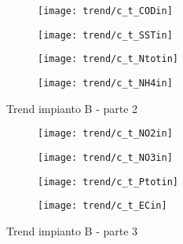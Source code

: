 \begin{sidewaysfigure}[h]\ContinuedFloat
	\renewcommand*\thesubfigure{(\arabic{subfigure})}
	\begin{subfigure}{0.49\textwidth}
		\texttt{[image: trend/c\_t\_CODin]}
		\caption{}
		\label{fig:c_t_CODin}
		\centering
	\end{subfigure}
	\begin{subfigure}{0.49\textwidth}
		\texttt{[image: trend/c\_t\_SSTin]}
		\caption{}
		\centering
	\end{subfigure}

	\begin{subfigure}{0.49\textwidth}
		\texttt{[image: trend/c\_t\_Ntotin]}
		\caption{}
		\centering
	\end{subfigure}
	\begin{subfigure}{0.49\textwidth}
		\texttt{[image: trend/c\_t\_NH4in]}	
		\caption{}
		\centering
	\end{subfigure}
	\caption{Trend impianto B - parte 2}
\end{sidewaysfigure}

\begin{sidewaysfigure}[h]\ContinuedFloat
	\renewcommand*\thesubfigure{(\arabic{subfigure})}
	\begin{subfigure}{0.49\textwidth}
		\texttt{[image: trend/c\_t\_NO2in]}
		\caption{}
		\label{fig:c_t_NO2in}
		\centering
	\end{subfigure}
	\begin{subfigure}{0.49\textwidth}
		\texttt{[image: trend/c\_t\_NO3in]}
		\caption{}
		\centering
	\end{subfigure}

	\begin{subfigure}{0.49\textwidth}
		\texttt{[image: trend/c\_t\_Ptotin]}
		\caption{}
		\centering
	\end{subfigure}
	\begin{subfigure}{0.49\textwidth}
		\texttt{[image: trend/c\_t\_ECin]}	
		\caption{}
		\centering
	\end{subfigure}
	\caption{Trend impianto B - parte 3}
\end{sidewaysfigure}

